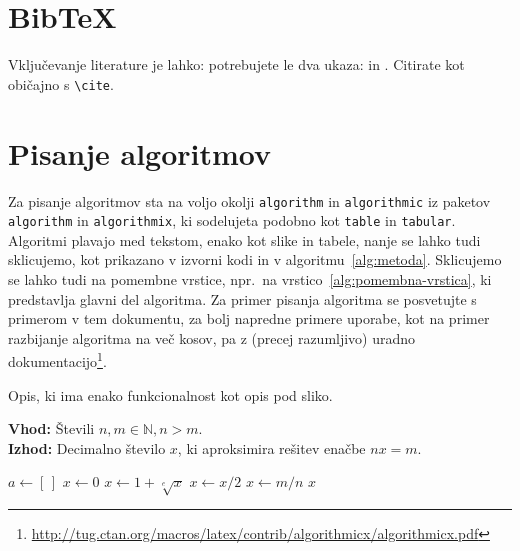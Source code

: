 \documentclass[a4paper,oneside,12pt]{article}
\title{\Title}
\author{\Author}
\date{\today}
\newcommand{\N}{\ensuremath{\mathbb{N}}}
\begin{document}
\section{BibTeX}
Vključevanje literature je lahko: potrebujete le dva ukaza:
\verb|| in \verb||.
Citirate kot običajno s \verb|\cite|.

\section{Pisanje algoritmov}
Za pisanje algoritmov sta na voljo okolji \texttt{algorithm} in
\texttt{algorithmic} iz paketov \texttt{algorithm} in \texttt{algorithmix}, ki
sodelujeta podobno kot \texttt{table} in \texttt{tabular}. Algoritmi plavajo
med tekstom, enako kot slike in tabele, nanje se lahko tudi sklicujemo, kot
prikazano v izvorni kodi in v algoritmu~\ref{alg:metoda}. Sklicujemo se lahko
tudi na pomembne vrstice, npr.\ na vrstico~\ref{alg:pomembna-vrstica}, ki
predstavlja glavni del algoritma. Za primer pisanja algoritma se posvetujte s
primerom v tem dokumentu, za bolj napredne primere uporabe, kot na primer
razbijanje algoritma na več kosov, pa z (precej razumljivo) uradno
dokumentacijo\footnote{\url{http://tug.ctan.org/macros/latex/contrib/algorithmicx/algorithmicx.pdf}}.


\begin{algorithm}[ht]
  \caption{Opis, ki ima enako funkcionalnost kot opis pod sliko.}
  \label{alg:metoda}
  \raggedright
  \textbf{Vhod:} Števili $n, m \in \N, n > m$. \\
  \textbf{Izhod:} Decimalno število $x$, ki aproksimira rešitev enačbe $n x = m$.
  \begin{algorithmic}[1]
     
    \State $a \gets [\,]$ 
    \State {}
    \State {} 
    \Else
    \State {}
    \EndIf
    \EndFor
    \Statex  {}
    \State $x \gets 0$  
    \State $x \gets 1 + \sqrt[e]{x}$
    \EndFor
    \State $x \gets x / 2$
    \EndWhile
    \State $x \gets m / n$ \label{alg:pomembna-vrstica}
    \State \Return $x$  
    \EndFunction
  \end{algorithmic}
\end{algorithm}
\end{document}
